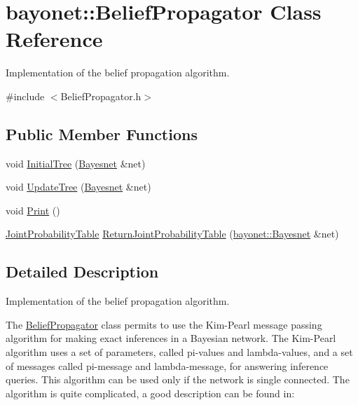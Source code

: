 \hypertarget{classbayonet_1_1_belief_propagator}{\section{bayonet\-:\-:Belief\-Propagator Class Reference}
\label{classbayonet_1_1_belief_propagator}
}


Implementation of the belief propagation algorithm.  




{\ttfamily \#include $<$Belief\-Propagator.\-h$>$}

\subsection*{Public Member Functions}
\begin{DoxyCompactItemize}
\item 
void \hyperlink{classbayonet_1_1_belief_propagator_ac9be764473228531c25af33db046d663}{Initial\-Tree} (\hyperlink{classbayonet_1_1_bayesnet}{Bayesnet} \&net)
\item 
void \hyperlink{classbayonet_1_1_belief_propagator_a8d66b5e99de3775df9beb17a084b9638}{Update\-Tree} (\hyperlink{classbayonet_1_1_bayesnet}{Bayesnet} \&net)
\item 
void \hyperlink{classbayonet_1_1_belief_propagator_ae593892ddb8eb9eb9787d487cbbce06c}{Print} ()
\item 
\hyperlink{classbayonet_1_1_joint_probability_table}{Joint\-Probability\-Table} \hyperlink{classbayonet_1_1_belief_propagator_af758ccf83bf74fd701168ba0a6196671}{Return\-Joint\-Probability\-Table} (\hyperlink{classbayonet_1_1_bayesnet}{bayonet\-::\-Bayesnet} \&net)
\end{DoxyCompactItemize}


\subsection{Detailed Description}
Implementation of the belief propagation algorithm. 

The \hyperlink{classbayonet_1_1_belief_propagator}{Belief\-Propagator} class permits to use the Kim-\/\-Pearl message passing algorithm for making exact inferences in a Bayesian network. The Kim-\/\-Pearl algorithm uses a set of parameters, called pi-\/values and lambda-\/values, and a set of messages called pi-\/message and lambda-\/message, for answering inference queries. This algorithm can be used only if the network is single connected. The algorithm is quite complicated, a good description can be found in\-:

